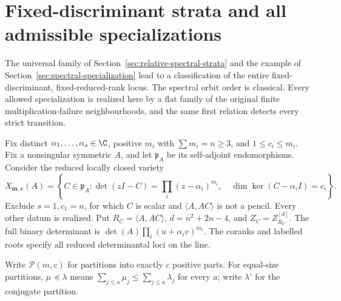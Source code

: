 \section{Fixed-discriminant strata and all admissible specializations}
\label{sec:fixed-spectral-strata}

The universal family of Section~\ref{sec:relative-spectral-strata}
and the example of Section~\ref{sec:spectral-specialization}
lead to a classification of the entire fixed-discriminant,
fixed-reduced-rank locus. The spectral orbit order is classical.
Every allowed specialization is realized here by a flat family of
the original finite multiplication-failure neighbourhoods, and the
same first relation detects every strict transition.

Fix distinct \(\alpha_1,\ldots,\alpha_s\in\C\), positive
\(m_i\) with \(\sum m_i=n\ge3\), and \(1\le c_i\le m_i\).
Fix a nonsingular symmetric \(A\), and let \(\mathfrak p_A\)
be its self-adjoint endomorphisms. Consider the reduced locally closed
variety
\begin{equation}\label{eq:fixed-spectral-locus}
 X_{\boldsymbol m,\boldsymbol c}(A)=
 \left\{C\in\mathfrak p_A:
 \det(zI-C)=\prod_i(z-\alpha_i)^{m_i},\quad
 \dim\ker(C-\alpha_i I)=c_i\right\}.
\end{equation}
Exclude \(s=1,c_1=n\), for which \(C\) is scalar and
\(\langle A,AC\rangle\) is not a pencil. Every other datum
is realized. Put \(R_C=\langle A,AC\rangle\),
\(d=n^2+2n-4\), and \(Z_C=Z_{R_C}^{[d]}\).
The full binary determinant is
\(\det(A)\prod_i(u+\alpha_i v)^{m_i}\). The coranks and
labelled roots specify all reduced determinantal loci on the line.

Write \(\mathcal P(m,c)\) for partitions into exactly \(c\)
positive parts. For equal-size partitions, \(\mu\preceq\lambda\)
means \(\sum_{j\le a}\mu_j\le\sum_{j\le a}\lambda_j\)
for every \(a\); write \(\lambda'\) for the conjugate partition.



